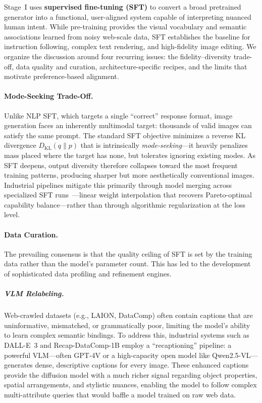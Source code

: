 \documentclass{llmxive}
\begin{document}
Stage~I uses \textbf{supervised fine-tuning (SFT)} to convert a broad pretrained generator into a functional, user-aligned system capable of interpreting nuanced human intent. While pre-training provides the visual vocabulary and semantic associations learned from noisy web-scale data, SFT establishes the baseline for instruction following, complex text rendering, and high-fidelity image editing. We organize the discussion around four recurring issues: the fidelity--diversity trade-off, data quality and curation, architecture-specific recipes, and the limits that motivate preference-based alignment.


\paragraph{Mode-Seeking Trade-Off.}
{Unlike NLP SFT, which targets a single ``correct'' response format, image generation faces an inherently multimodal target: thousands of valid images can satisfy the same prompt. The standard SFT objective minimizes a reverse KL divergence $D_{\mathrm{KL}}(q\|p)$ that is intrinsically \emph{mode-seeking}---it heavily penalizes mass placed where the target has none, but tolerates ignoring existing modes. As SFT deepens, output diversity therefore collapses toward the most frequent training patterns, producing sharper but more aesthetically conventional images. Industrial pipelines mitigate this primarily through model merging across specialized SFT runs~\citep{cai2025z,team2025longcat}---linear weight interpolation that recovers Pareto-optimal capability balance---rather than through algorithmic regularization at the loss level.}

\paragraph{Data Curation.}

The prevailing consensus is that the quality ceiling of SFT is set by the training data rather than the model's parameter count. This has led to the development of sophisticated data profiling and refinement engines.

\subparagraph{VLM Relabeling.}
Web-crawled datasets (e.g., LAION, DataComp) often contain captions that are uninformative, mismatched, or grammatically poor, limiting the model's ability to learn complex semantic bindings. To address this, industrial systems such as DALL-E~3 and Recap-DataComp-1B employ a ``recaptioning'' pipeline: a powerful VLM---often GPT-4V or a high-capacity open model like Qwen2.5-VL---generates dense, descriptive captions for every image. These enhanced captions provide the diffusion model with a much richer signal regarding object properties, spatial arrangements, and stylistic nuances, enabling the model to follow complex multi-attribute queries that would baffle a model trained on raw web data.
\end{document}
